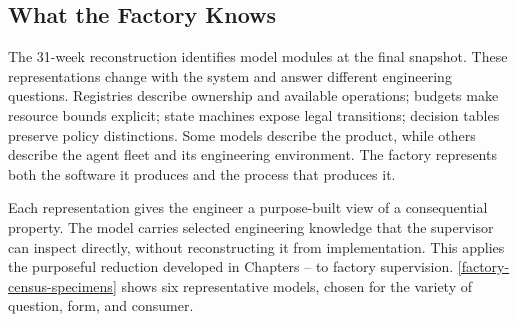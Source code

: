 \subsection{What the Factory Knows}\label{heading:what-the-factory-knows}


The 31-week reconstruction identifies  model modules at the final snapshot. These representations change with the system and answer different engineering questions. Registries describe ownership and available operations; budgets make resource bounds explicit; state machines expose legal transitions; decision tables preserve policy distinctions. Some models describe the product, while others describe the agent fleet and its engineering environment. The factory represents both the software it produces and the process that produces it.


Each representation gives the engineer a purpose-built view of a consequential property. The model carries selected engineering knowledge that the supervisor can inspect directly, without reconstructing it from implementation. This applies the purposeful reduction developed in Chapters -- to factory supervision. \autoref{factory-census-specimens} shows six representative models, chosen for the variety of question, form, and consumer.

